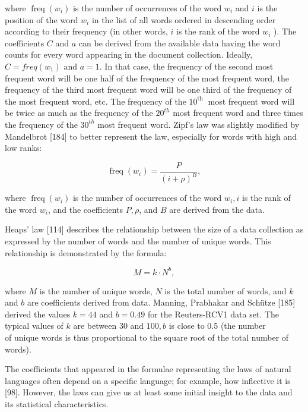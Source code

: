 \documentclass[10pt]{book}
\begin{document}
where $\operatorname{freq}\left(w_{i}\right)$ is the number of occurrences of the word $w_{i}$ and $i$ is the position of the word $w_{i}$ in the list of all words ordered in descending order according to their frequency (in other words, $i$ is the rank of the word $w_{i}$ ). The coefficients $C$ and $a$ can be derived from the available data having the word counts for every word appearing in the document collection. Ideally, $C=f r e q\left(w_{1}\right)$ and $a=1$. In that case, the frequency of the second most frequent word will be one half of the frequency of the most frequent word, the frequency of the third most frequent word will be one third of the frequency of the most frequent word, etc. The frequency of the $10^{\text {th }}$ most frequent word will be twice as much as the frequency of the $20^{t h}$ most frequent word and three times the frequency of the $30^{t h}$ most frequent word. Zipf's law was slightly modified by Mandelbrot [184] to better represent the law, especially for words with high and low ranks:


\begin{equation*}
\operatorname{freq}\left(w_{i}\right)=\frac{P}{(i+\rho)^{B}}, \tag{3.2}
\end{equation*}


where $\operatorname{freq}\left(w_{i}\right)$ is the number of occurrences of the word $w_{i}, i$ is the rank of the word $w_{i}$, and the coefficients $P, \rho$, and $B$ are derived from the data.

Heaps' law [114] describes the relationship between the size of a data collection as expressed by the number of words and the number of unique words. This relationship is demonstrated by the formula:


\begin{equation*}
M=k \cdot N^{b}, \tag{3.3}
\end{equation*}


where $M$ is the number of unique words, $N$ is the total number of words, and $k$ and $b$ are coefficients derived from data. Manning, Prabhakar and Schütze [185] derived the values $k=44$ and $b=0.49$ for the Reuters-RCV1 data set. The typical values of $k$ are between 30 and $100, b$ is close to 0.5 (the number\\
of unique words is thus proportional to the square root of the total number of words).

The coefficients that appeared in the formulae representing the laws of natural languages often depend on a specific language; for example, how inflective it is [98]. However, the laws can give us at least some initial insight to the data and its statistical characteristics.
\end{document}
